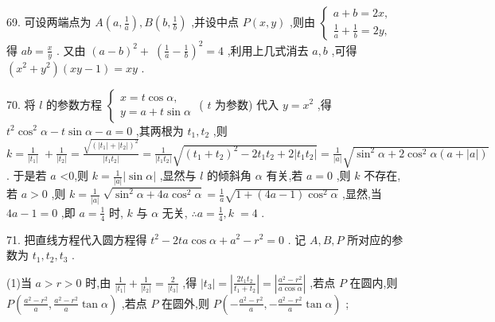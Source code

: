 \documentclass[10pt]{article}
\begin{document}
69. 可设两端点为 \(A\left( {a,\frac{1}{a}}\right) ,B\left( {b,\frac{1}{b}}\right)\) ,并设中点 \(P\left( {x,y}\right)\) ,则由 \(\left\{  \begin{array}{l} a + b = {2x}, \\  \frac{1}{a} + \frac{1}{b} = {2y}, \end{array}\right.\) 得 \({ab} = \frac{x}{y}\) . 又由 \({\left( a - b\right) }^{2} + \; {\left( \frac{1}{a} - \frac{1}{b}\right) }^{2} = 4\) ,利用上几式消去 \(a,b\) ,可得 \(\left( {{x}^{2} + {y}^{2}}\right) \left( {{xy} - 1}\right)  = {xy}\) .

70. 将 \(l\) 的参数方程 \(\left\{  \begin{array}{l} x = t\cos \alpha , \\  y = a + t\sin \alpha  \end{array}\right.\) ( \(t\) 为参数) 代入 \(y = {x}^{2}\) ,得 \({t}^{2}{\cos }^{2}\alpha  - t\sin \alpha  - a = 0\) ,其两根为 \({t}_{1},{t}_{2}\) ,则 \(k = \frac{1}{\left| {t}_{1}\right| } \; + \frac{1}{\left| {t}_{2}\right| } = \frac{\sqrt{{\left( \left| {t}_{1}\right|  + \left| {t}_{2}\right| \right) }^{2}}}{\left| {t}_{1}{t}_{2}\right| } = \frac{1}{\left| {t}_{1}{t}_{2}\right| }\sqrt{{\left( {t}_{1} + {t}_{2}\right) }^{2} - 2{t}_{1}{t}_{2} + 2\left| {{t}_{1}{t}_{2}}\right| } = \frac{1}{\left| a\right| }\sqrt{{\sin }^{2}\alpha  + 2{\cos }^{2}\alpha \left( {a + \left| a\right| }\right) }\) . 于是若 \(a\) <0,则 \(k = \frac{1}{\left| a\right| }\left| {\sin \alpha }\right|\) ,显然与 \(l\) 的倾斜角 \(\alpha\) 有关,若 \(a = 0\) ,则 \(k\) 不存在,若 \(a > 0\) ,则 \(k = \frac{1}{\left| a\right| } \; \sqrt{{\sin }^{2}\alpha  + {4a}{\cos }^{2}\alpha } = \frac{1}{a}\sqrt{1 + \left( {{4a} - 1}\right) {\cos }^{2}\alpha }\) ,显然,当 \({4a} - 1 = 0\) ,即 \(a = \frac{1}{4}\) 时, \(k\) 与 \(\alpha\) 无关, \(\therefore a = \frac{1}{4},k \; = 4\) .

71. 把直线方程代入圆方程得 \({t}^{2} - {2ta}\cos \alpha  + {a}^{2} - {r}^{2} = 0\) . 记 \(A,B,P\) 所对应的参数为 \({t}_{1},{t}_{2},{t}_{3}\) .

(1)当 \(a > r > 0\) 时,由 \(\frac{1}{\left| {t}_{1}\right| } + \frac{1}{\left| {t}_{2}\right| } = \frac{2}{\left| {t}_{3}\right| }\) ,得 \(\left| {t}_{3}\right|  = \left| \frac{2{t}_{1}{t}_{2}}{{t}_{1} + {t}_{2}}\right|  = \left| \frac{{a}^{2} - {r}^{2}}{a\cos \alpha }\right|\) ,若点 \(P\) 在圆内,则 \(P\left( {\frac{{a}^{2} - {r}^{2}}{a},\frac{{a}^{2} - {r}^{2}}{a}\tan \alpha }\right)\) ,若点 \(P\) 在圆外,则 \(P\left( {-\frac{{a}^{2} - {r}^{2}}{a}, - \frac{{a}^{2} - {r}^{2}}{a}\tan \alpha }\right)\) ;
\end{document}

